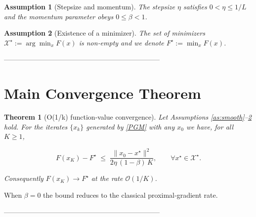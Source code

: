 \documentclass{article}
\newtheorem{theorem}{Theorem}
\newtheorem{assumption}{Assumption}
\begin{document}
\begin{assumption}[Stepsize and momentum]\label{as:params}
The stepsize $\eta$ satisfies $0<\eta\le 1/L$ and the momentum parameter obeys $0\le\beta<1$.
\end{assumption}

\begin{assumption}[Existence of a minimizer]\label{as:opt}
The set of minimizers $\mathcal{X}^\star:=\arg\min_{x}F(x)$ is non‑empty and we denote
$F^\star:=\min_xF(x)$.
\end{assumption}

--------------------------------------------------------------------

\section*{Main Convergence Theorem}
\begin{theorem}[O(1/k) function‑value convergence]\label{thm:conv}
Let Assumptions \ref{as:smooth}–\ref{as:opt} hold.  
For the iterates $\{x_k\}$ generated by \eqref{PGM} with any $x_0$ we have, for all $K\ge1$,

\[
F(x_K)-F^\star \;\le\;
\frac{ \|x_0-x^\star\|^2 }{2\eta\, (1-\beta)\,K},
\qquad\forall x^\star\in\mathcal{X}^\star .
\tag{T1}
\]

Consequently $F(x_K)\to F^\star$ at the rate $\mathcal{O}(1/K)$.
\end{theorem}

When $\beta=0$ the bound reduces to the classical proximal‑gradient rate.

--------------------------------------------------------------------
\end{document}
